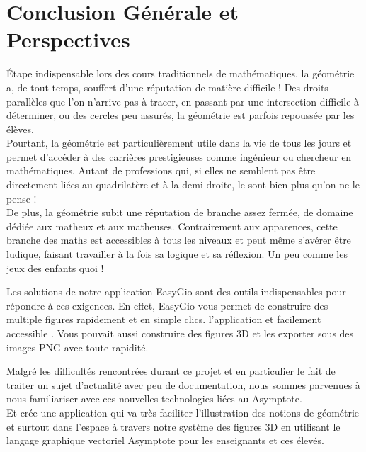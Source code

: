 \documentclass[a4paper]{report}
\begin{document}
\chapter*{Conclusion Générale et Perspectives}
Étape indispensable lors des cours traditionnels de mathématiques, la géométrie a, de tout temps, souffert d'une réputation de matière difficile ! Des droits parallèles que l'on n'arrive pas à tracer, en passant par une intersection difficile à déterminer, ou des cercles peu assurés, la géométrie est parfois repoussée par les élèves.\\
Pourtant, la géométrie est particulièrement utile dans la vie de tous les jours et permet d'accéder à des carrières prestigieuses comme ingénieur ou chercheur en mathématiques. Autant de professions qui, si elles ne semblent pas être directement liées au quadrilatère et à la demi-droite, le sont bien plus qu'on ne le pense !\\
De plus, la géométrie subit une réputation de branche assez fermée, de domaine dédiée aux matheux et aux matheuses. Contrairement aux apparences, cette branche des maths est accessibles à tous les niveaux et peut même s'avérer être ludique, faisant travailler à la fois sa logique et sa réflexion. Un peu comme les jeux des enfants quoi !\\
\par Les solutions de notre application EasyGio sont des outils indispensables pour répondre à ces exigences. En effet, EasyGio vous permet de construire des multiple figures rapidement et en simple clics. l'application et facilement accessible . Vous pouvait aussi construire des figures 3D et les exporter sous des images PNG avec toute rapidité.\\
\par Malgré les difficultés rencontrées durant ce projet et en particulier le fait de traiter un sujet d’actualité avec peu de documentation, nous sommes parvenues à nous familiariser avec ces nouvelles technologies liées au Asymptote.\\
Et crée une application qui va très faciliter l'illustration des notions de géométrie et surtout dans l'espace à travers notre système des figures 3D en utilisant le langage graphique vectoriel Asymptote pour les enseignants et ces élevés.\\ 
\end{document}
